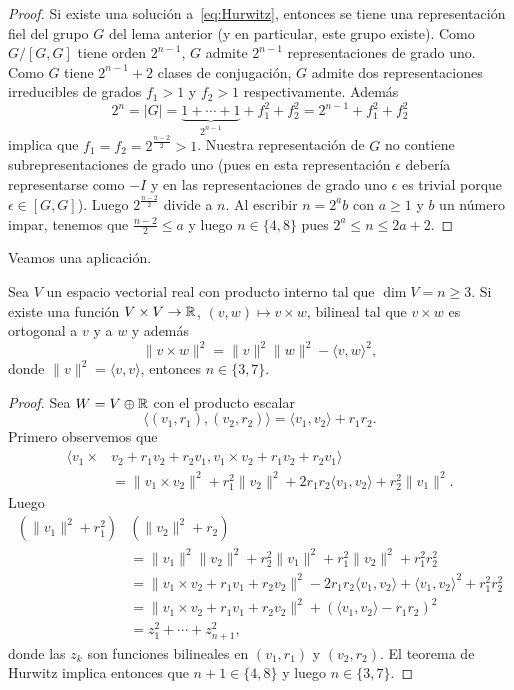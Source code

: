 \begin{proof}
	
	Si existe una solución a~\ref{eq:Hurwitz}, entonces se tiene una
	representación fiel del grupo $G$ del lema anterior (y en particular, este
	grupo existe). Como $G/[G,G]$ tiene orden $2^{n-1}$, $G$ admite $2^{n-1}$
	representaciones de grado uno. Como $G$ tiene $2^{n-1}+2$ clases de
	conjugación, $G$ admite dos representaciones irreducibles de grados $f_1>1$
	y $f_2>1$ respectivamente. Además 
	\[
		2^n=|G|=\underbrace{1+\cdots+1}_{2^{n-1}}+f_1^2+f_2^2=2^{n-1}+f_1^2+f_2^2
	\]
	implica que $f_1=f_2=2^{\frac{n-2}{2}}>1$. Nuestra representación de
	$G$ no contiene subrepresentaciones de grado uno (pues en esta
	representación $\epsilon$ debería representarse como $-I$ y en las
	representaciones de grado uno $\epsilon$ es trivial porque
	$\epsilon\in[G,G]$). Luego $2^{\frac{n-2}{2}}$ divide a $n$. Al escribir
	$n=2^ab$ con $a\geq 1$ y $b$ un número impar, tenemos que
	$\frac{n-2}{2}\leq a$ y luego $n\in\{4,8\}$ pues $2^a\leq n\leq 2a+2$. 
\end{proof}

Veamos una aplicación. 

\begin{theorem}
	Sea $V$ un espacio vectorial real con producto interno tal que $\dim
	V=n\geq3$. Si existe una función $V\times V\to\mathbb{R}$, $(v,w)\mapsto v\times
	w$, bilineal tal que $v\times w$ es ortogonal a $v$ y a $w$ y además 
	\[
		\|v\times w\|^2=\|v\|^2\|w\|^2-\langle v,w\rangle^2,
	\]
	donde $\|v\|^2=\langle v,v\rangle$, entonces $n\in\{3,7\}$. 
\end{theorem}

\begin{proof}
	Sea $W=V\oplus\mathbb{R}$ con el producto escalar 
	\[
		\langle (v_1,r_1),(v_2,r_2)\rangle = \langle v_1,v_2\rangle+r_1r_2.
	\]
	Primero observemos que
	\begin{align*}
		\langle v_1\times &v_2+r_1v_2+r_2v_1,v_1\times v_2+r_1v_2+r_2v_1\rangle\\
		&=\|v_1\times v_2\|^2+r_1^2\|v_2\|^2+2r_1r_2\langle v_1,v_2\rangle+r_2^2\|v_1\|^2.
	\end{align*}
	Luego 
	\begin{align*}
		(\|v_1\|^2+r_1^2)&(\|v_2\|^2+r_2)\\
		&= \|v_1\|^2\|v_2\|^2+r_2^2\|v_1\|^2+r_1^2\|v_2\|^2+r_1^2r_2^2\\
		&=\|v_1\times v_2+r_1v_1+r_2v_2\|^2-2r_1r_2\langle v_1,v_2\rangle+\langle v_1,v_2\rangle^2+r_1^2r_2^2\\
		&=\|v_1\times v_2+r_1v_1+r_2v_2\|^2+(\langle v_1,v_2\rangle-r_1r_2)^2\\
		&=z_1^2+\cdots+z_{n+1}^2,
	\end{align*}
	donde las $z_k$ son funciones bilineales en $(v_1,r_1)$ y $(v_2,r_2)$. El teorema de Hurwitz implica
	entonces que $n+1\in\{4,8\}$ y luego $n\in\{3,7\}$.
\end{proof}

